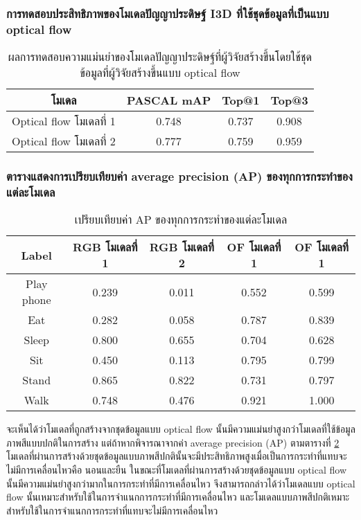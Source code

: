 \subsubsection{การทดสอบประสิทธิภาพของโมเดลปัญญาประดิษฐ์ I3D ที่ใช้ชุดข้อมูลที่เป็นแบบ optical flow}
\begin{table}[!ht]
	\centering
	\begin{tabular}{|c|c|c|c|}
			\hline
			{โมเดล}	&	{PASCAL mAP}	&	{Top@1}	&	{Top@3}\\
			\hline
			Optical flow โมเดลที่ 1	& 0.748	& 0.737	& 0.908	\\
			Optical flow โมเดลที่ 2	& 0.777	& 0.759	& 0.959	\\
			\hline
	\end{tabular}
\caption{ผลการทดสอบความแม่นยำของโมเดลปัญญาประดิษฐ์ที่ผู้วิจัยสร้างขึ้นโดยใช้ชุดข้อมูลที่ผู้วิจัยสร้างขึ้นแบบ optical flow}
\label{tab:I3D_OP_performance}
\end{table}


\subsubsection{ตารางแสดงการเปรียบเทียบค่า average precision (AP) ของทุกการกระทำของแต่ละโมเดล}
\begin{table}[!ht]
	\centering
	\begin{tabular}{|c|c|c|c|c|}
			\hline
			{Label} & {RGB โมเดลที่ 1} & {RGB โมเดลที่ 2} & {OF โมเดลที่ 1} & {OF โมเดลที่ 1}\\
			\hline
			Play phone  & 0.239 & 0.011 & 0.552 & 0.599	\\
			Eat			& 0.282	& 0.058	& 0.787	& 0.839	\\
			Sleep		& 0.800	& 0.655	& 0.704	& 0.628	\\
			Sit		 	& 0.450 & 0.113 & 0.795 & 0.799	\\
			Stand		& 0.865	& 0.822	& 0.731	& 0.797	\\
			Walk		& 0.748	& 0.476	& 0.921	& 1.000	\\
			\hline
	\end{tabular}
\caption{เปรียบเทียบค่า AP ของทุกการกระทำของแต่ละโมเดล}
\label{tab:I3D_RGB_OP_AP}
\end{table}
จะเห็นได้ว่าโมเดลที่ถูกสร้างจากชุดข้อมูลแบบ optical flow นั้นมีความแม่นยำสูงกว่าโมเดลที่ใช้ข้อมูลภาพสีแบบปกติในการสร้าง แต่ถ้าหากพิจารณาจากค่า average precision (AP) 
ตามตารางที่ \ref{tab:I3D_RGB_OP_AP} โมเดลที่ผ่านการสร้างด้วยชุดข้อมูลแบบภาพสีปกตินั้นจะมีประสิทธิภาพสูงเมื่อเป็นการกระทำที่แทบจะไม่มีการเคลื่อนไหวคือ นอนและยืน 
ในขณะที่โมเดลที่ผ่านการสร้างด้วยชุดข้อมูลแบบ optical flow นั้นมีความแม่นยำสูงกว่ามากในการกระทำที่มีการเคลื่อนไหว จึงสามารถกล่าวได้ว่าโมเดลแบบ optical flow 
นั้นเหมาะสำหรับใช้ในการจำแนกการกระทำที่มีการเคลื่อนไหว และโมเดลแบบภาพสีปกติเหมาะสำหรับใช้ในการจำแนกการกระทำที่แทบจะไม่มีการเคลื่อนไหว

